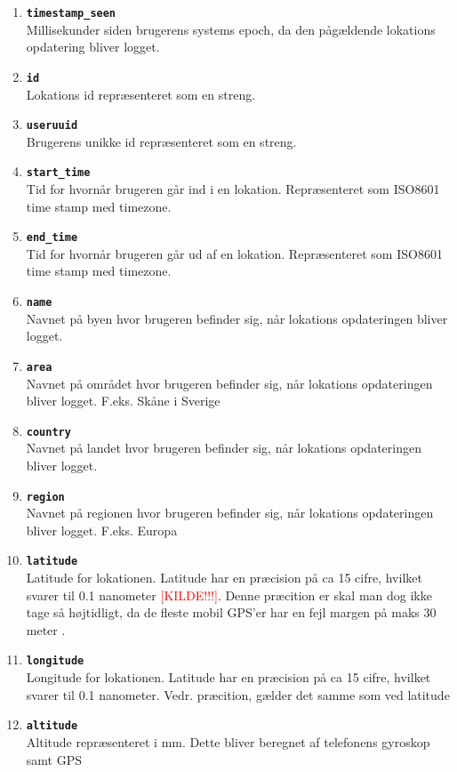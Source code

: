 \begin{enumerate}
\item \texttt{\textbf{timestamp\_seen}}\\Millisekunder siden brugerens systems epoch, da den pågældende lokations opdatering bliver logget. 
\item \texttt{\textbf{id}}\\Lokations id repræsenteret som en streng. 
\item \texttt{\textbf{useruuid}}\\Brugerens unikke id repræsenteret som en streng.
\item \texttt{\textbf{start\_time}}\\Tid for hvornår brugeren går ind i en lokation. Repræsenteret som ISO8601 time stamp med timezone.
\item \texttt{\textbf{end\_time}}\\Tid for hvornår brugeren går ud af en lokation. Repræsenteret som ISO8601 time stamp med timezone.
\item \texttt{\textbf{name}}\\Navnet på byen hvor brugeren befinder sig, når lokations opdateringen bliver logget.
\item \texttt{\textbf{area}}\\Navnet på området hvor brugeren befinder sig, når lokations opdateringen bliver logget. F.eks. Skåne i Sverige
\item \texttt{\textbf{country}}\\Navnet på landet hvor brugeren befinder sig, når lokations opdateringen bliver logget.
\item \texttt{\textbf{region}}\\Navnet på regionen hvor brugeren befinder sig, når lokations opdateringen bliver logget. F.eks. Europa
\item \texttt{\textbf{latitude}}\\Latitude for lokationen. Latitude har en præcision på ca 15 cifre, hvilket svarer til 0.1 nanometer \textcolor{red}{[KILDE!!!]}. Denne præcition er skal man dog ikke tage så højtidligt, da de fleste mobil GPS'er har en fejl margen på maks 30 meter \cite{NAV:8292634}.  
\item \texttt{\textbf{longitude}}\\Longitude for lokationen. Latitude har en præcision på ca 15 cifre, hvilket svarer til 0.1 nanometer. Vedr. præcition, gælder det samme som ved latitude
\item \texttt{\textbf{altitude}}\\Altitude repræsenteret i mm. Dette bliver beregnet af telefonens gyroskop samt GPS

\end{enumerate}
